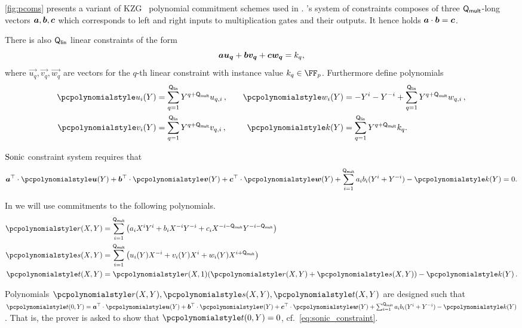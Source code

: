 \label{sec:sonic_constraint_system}
\cref{fig:pcoms} presents a variant of KZG~\cite{AC:KatZavGol10} polynomial commitment schemes used in \sonic{}. \sonic's system of constraints composes of three $\mathsf{Q_{mult}}$-long vectors
$\va, \vb, \vc$ which corresponds to left and right inputs to multiplication
gates and their outputs. It hence holds $\va \cdot \vb = \vc$.

There is also $\mathsf{Q_{lin}}$ linear constraints of the form
\[
  \va \vec{u_q} + \vb \vec{v_q} + \vc \vec{w_q} = k_q,
\]
where $\vec{u_q}, \vec{v_q}, \vec{w_q}$ are vectors for the $q$-th linear
constraint with instance value $k_q \in \FF_p$. Furthermore define polynomials
\begin{equation}
  \begin{split}
    \p{u_i}(Y) & = \sum_{q = 1}^\linconstr Y^{q + \multconstr} u_{q, i}\,,\\
    \p{v_i}(Y) & = \sum_{q = 1}^\linconstr Y^{q + \multconstr} v_{q, i}\,,\\
  \end{split}
  \qquad
  \begin{split}
    \p{w_i}(Y) & = -Y^i - Y^{-i} + \sum_{q = 1}^\linconstr Y^{q +
      \multconstr} w_{q, i}\,,\\
    \p{k}(Y) & = \sum_{q = 1}^\linconstr Y^{q + \multconstr} k_{q}.
  \end{split}
\end{equation}

${\textnormal{{Sonic}}}$ constraint system requires that
\begin{align}
  \label{eq:sonic_constraint}
  \vec{a}^\top \cdot \vec{\p{u}} (Y) + \vec{b}^\top \cdot \vec{\p{v}} (Y) +
  \vec{c}^\top \cdot \vec{\p{w}} (Y) + \sum_{i = 1}^{\multconstr} a_i b_i (Y^i +
  Y^{-i}) - \p{k} (Y) = 0.
\end{align}

In \sonic{} we will use commitments to the following polynomials.
\begin{align*}
  \pr(X, Y) & = \sum_{i = 1}^{\multconstr} \left(a_i X^i Y^i + b_i X^{-i} Y^{-i}
              + c_i X^{-i - \multconstr} Y^{-i - \multconstr}\right) \\
  \p{s}(X, Y) & = \sum_{i = 1}^{\multconstr} \left( u_i (Y) X^{-i} +
                v_i(Y) X^i + w_i(Y) X^{i + \multconstr}\right)\\
  \pt(X, Y) & = \pr(X, 1) (\pr(X, Y) + \p{s}(X, Y)) - \p{k}(Y)\,.
\end{align*}

Polynomials $\p{r} (X, Y), \p{s} (X, Y), \p{t} (X, Y)$ are designed such that
$\p{t} (0, Y) = \vec{a}^\top \cdot \vec{\p{u}} (Y) + \vec{b}^\top \cdot
\vec{\p{v}} (Y) + \vec{c}^\top \cdot \vec{\p{w}} (Y) + \sum_{i =
  1}^{\multconstr} a_i b_i (Y^i + Y^{-i}) - \p{k} (Y) $. That is, the prover is
asked to show that $\p{t} (0, Y) = 0$, cf.~\cref{eq:sonic_constraint}.

